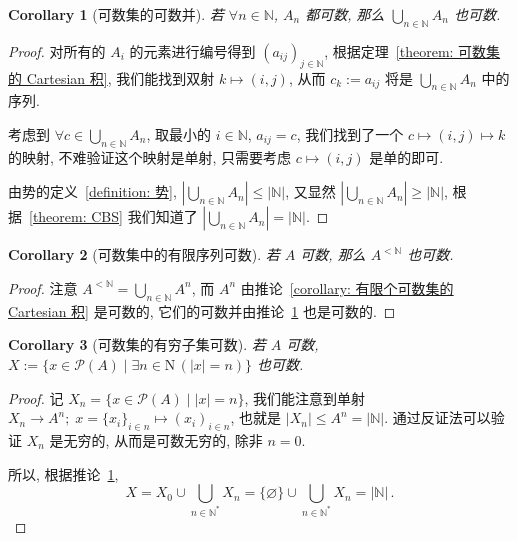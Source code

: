 \documentclass[openany]{ctexbook}
\theoremstyle{plain}
\newtheorem{corollary}{Corollary} %
\theoremstyle{definition}
\begin{document}
\begin{corollary}[可数集的可数并]\label{corollary: 可数集的可数并}
	若 $\forall n \in \mathbb N$, $A_n$ 都可数, 那么 $\bigcup_{n \in \mathbb N} A_n$ 也可数. 
\end{corollary}
\begin{proof}
	对所有的 $A_i$ 的元素进行编号得到 $(a_{ij})_{j \in \mathbb N}$, 根据定理~\ref{theorem: 可数集的 Cartesian 积}, 我们能找到双射 $k \mapsto (i,j)$, 从而 $c_k := a_{ij}$ 将是 $\bigcup_{n \in \mathbb N} A_n$ 中的序列. 
	
	考虑到 $\forall c \in \bigcup_{n \in \mathbb N} A_n$, 取最小的 $i \in \mathbb N$, $a_{ij} = c$, 我们找到了一个 $c \mapsto (i,j) \mapsto k$ 的映射, 不难验证这个映射是单射, 只需要考虑 $c \mapsto (i,j)$ 是单的即可.

	由势的定义~\ref{definition: 势}, $|\bigcup_{n \in \mathbb N} A_n| \leq |\mathbb N|$, 又显然 $|\bigcup_{n \in \mathbb N} A_n| \geq |\mathbb N|$, 根据~\ref{theorem: CBS} 我们知道了 $|\bigcup_{n \in \mathbb N} A_n| = |\mathbb N|$.
\end{proof}

\begin{corollary}[可数集中的有限序列可数]
	若 $A$ 可数, 那么 $A^{< \mathbb N}$ 也可数.
\end{corollary}
\begin{proof}
	注意 $A^{< \mathbb N} = \bigcup_{n \in \mathbb N} A^n$, 而 $A^n$ 由推论~\ref{corollary: 有限个可数集的 Cartesian 积} 是可数的, 它们的可数并由推论~\ref{corollary: 可数集的可数并} 也是可数的.
\end{proof}

\begin{corollary}[可数集的有穷子集可数]
	若 $A$ 可数, $X := \{x \in \mathscr P(A) \mid \exists n \in \mathrm N \,(|x| = n)\}$ 也可数.
\end{corollary}
\begin{proof}
	记 $X_n = \{x \in \mathscr P(A) \mid |x| = n\}$, 我们能注意到单射 $X_n \to A^n;\; x = \{x_i\}_{i \in n} \mapsto (x_i)_{i \in n}$, 也就是 $|X_n| \leq A^n = |\mathbb N|$. 通过反证法可以验证 $X_n$ 是无穷的, 从而是可数无穷的, 除非 $n = 0$.

	所以, 根据推论~\ref{corollary: 可数集的可数并}, 
	\begin{equation*}
		X = X_0 \cup \bigcup_{n \in \mathbb N^*} X_n
			= \{\varnothing\} \cup \bigcup_{n \in \mathbb N^*} X_n = |\mathbb N|\,.
	\end{equation*}
\end{proof}
\end{document}
